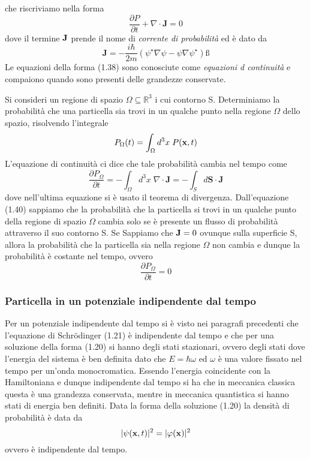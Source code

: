  che riscriviamo nella forma 
 \begin{equation}
 	\frac{\partial P}{\partial t}+\nabla \cdot \mathbf{J}=0
 \end{equation}
 dove il termine $\bold{J}$ prende il nome di \textit{corrente di probabilit\`a} ed \`e dato da 
 \begin{equation}
 	\mathbf{J}=-\frac{i \hbar}{2 m}\left(\psi^{\star} \nabla \psi-\psi \nabla \psi^{\star}\right)ß
 \end{equation}
 Le equazioni della forma (1.38) sono conosciute come \textit{equazioni d continuit\`a} e compaiono quando sono presenti delle grandezze conservate.
 
 \noindent Si consideri un regione di spazio $\Omega \subseteq \mathbb{R}^3$ i cui contorno S. Determiniamo la probabilit\`a che una particella sia trovi in un  qualche punto nella regione $\Omega$ dello spazio, risolvendo l'integrale
 \begin{equation*}
 	P_\Omega(t) = \int_{\Omega} d^3x \; P(\bold{x},t)
 \end{equation*}
 L'equazione di continuit\`a ci dice che tale probabilit\`a cambia nel tempo come
 \begin{equation}
 	\frac{\partial P_\Omega}{\partial t}=-\int_\Omega d^3 x \; \nabla \cdot \mathbf{J}=-\int_S d \mathbf{S} \cdot \mathbf{J}
 \end{equation}
 dove nell'ultima equazione si \`e usato il teorema di divergenza. Dall'equazione (1.40) sappiamo che la probabilit\`a che la particella si trovi in un qualche punto della regione di spazio $\Omega$ cambia solo se \`e presente un flusso di probabilit\`a attraverso il suo contorno S. Se Sappiamo che $\bold{J} = 0$ ovunque sulla superficie S, allora la probabilit\`a che la particella sia nella regione $\Omega $ non cambia e dunque la probabilit\`a \`e costante nel tempo, ovvero
 \begin{equation*}
 	\frac{\partial P_{\Omega}}{\partial t} = 0
 \end{equation*} 
 
 \newpage
 
 \subsubsection{Particella in un potenziale indipendente dal tempo}
 
 Per un potenziale indipendente dal tempo si \`e visto nei paragrafi precedenti che l'equazione di Schr\"odinger (1.21) \`e indipendente dal tempo e che per una soluzione della forma (1.20) si hanno degli stati stazionari, ovvero degli stati dove l'energia del sistema \`e ben definita dato che $E = \hbar \omega$ ed $\omega$ \`e una valore fissato nel tempo per un'onda monocromatica. Essendo l'energia coincidente con la Hamiltoniana e dunque indipendente dal tempo si ha che in meccanica classica questa \`e una grandezza conservata, mentre in meccanica quantistica  si hanno stati di energia ben definiti. Data la forma della soluzione (1.20) la densit\`a di probabilit\`a \`e data da 
 \begin{equation*}
 	|\psi(\bold{x},t)|^2 = |\varphi(\bold{x})|^2
 \end{equation*}
 ovvero \`e indipendente dal tempo.
 
